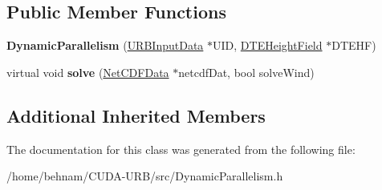 \subsection*{Public Member Functions}
\begin{DoxyCompactItemize}
\item 
\mbox{\label{classDynamicParallelism_acc31e51a0f4a462d60d53053abfcbf66}} 
{\bfseries Dynamic\+Parallelism} (\hyperlink{classURBInputData}{U\+R\+B\+Input\+Data} $\ast$U\+ID, \hyperlink{classDTEHeightField}{D\+T\+E\+Height\+Field} $\ast$D\+T\+E\+HF)
\item 
\mbox{\label{classDynamicParallelism_a43c7a33a4853ef887c78c3d28b9caaf5}} 
virtual void {\bfseries solve} (\hyperlink{classNetCDFData}{Net\+C\+D\+F\+Data} $\ast$netcdf\+Dat, bool solve\+Wind)
\end{DoxyCompactItemize}
\subsection*{Additional Inherited Members}


The documentation for this class was generated from the following file\+:\begin{DoxyCompactItemize}
\item 
/home/behnam/\+C\+U\+D\+A-\/\+U\+R\+B/src/Dynamic\+Parallelism.\+h\end{DoxyCompactItemize}
